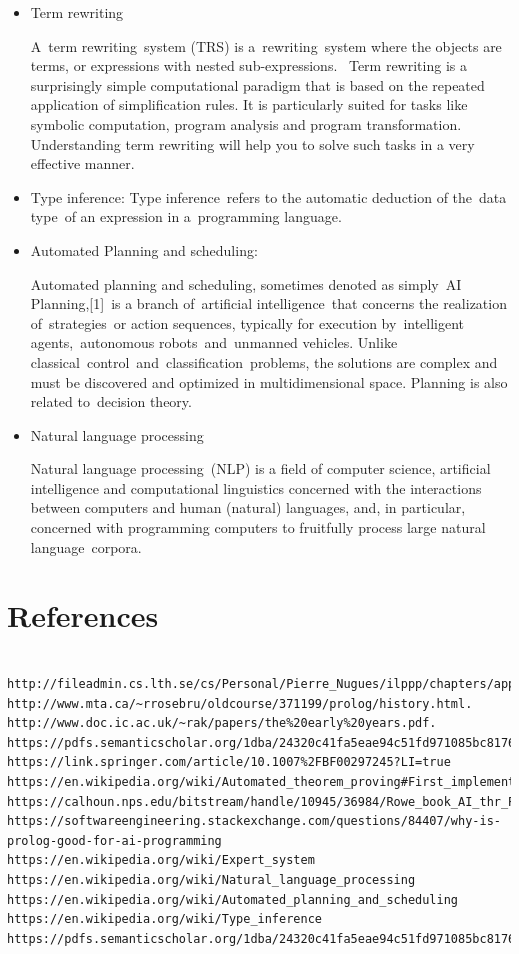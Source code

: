 \documentclass[14pt]{article}
\begin{document}
\begin{itemize}
\item Term rewriting

A term rewriting system (TRS) is a rewriting system where the objects are terms, or expressions with nested sub-expressions. 
Term rewriting is a surprisingly simple computational paradigm that is based on the repeated application of simplification rules. It is particularly suited for tasks like symbolic computation, program analysis and program transformation. Understanding term rewriting will help you to solve such tasks in a very effective manner.

\item Type inference: 
Type inference refers to the automatic deduction of the data type of an expression in a programming language.

\item Automated Planning and scheduling: 

Automated planning and scheduling, sometimes denoted as simply AI Planning,[1] is a branch of artificial intelligence that concerns the realization of strategies or action sequences, typically for execution by intelligent agents, autonomous robots and unmanned vehicles. Unlike classical control and classification problems, the solutions are complex and must be discovered and optimized in multidimensional space. Planning is also related to decision theory.


\item Natural language processing

Natural language processing (NLP) is a field of computer science, artificial intelligence and computational linguistics concerned with the interactions between computers and human (natural) languages, and, in particular, concerned with programming computers to fruitfully process large natural language corpora.
\end{itemize}
\newpage
\section{References} 
\begin{verbatim}
	
http://fileadmin.cs.lth.se/cs/Personal/Pierre_Nugues/ilppp/chapters/appA.pdf.
http://www.mta.ca/~rrosebru/oldcourse/371199/prolog/history.html. 
http://www.doc.ic.ac.uk/~rak/papers/the%20early%20years.pdf.
https://pdfs.semanticscholar.org/1dba/24320c41fa5eae94c51fd971085bc8176dd7.pdf
https://link.springer.com/article/10.1007%2FBF00297245?LI=true
https://en.wikipedia.org/wiki/Automated_theorem_proving#First_implementations
https://calhoun.nps.edu/bitstream/handle/10945/36984/Rowe_book_AI_thr_Prolog_preface.pdf https://softwareengineering.stackexchange.com/questions/84407/why-is-prolog-good-for-ai-programming
https://en.wikipedia.org/wiki/Expert_system
https://en.wikipedia.org/wiki/Natural_language_processing 
https://en.wikipedia.org/wiki/Automated_planning_and_scheduling 
https://en.wikipedia.org/wiki/Type_inference https://pdfs.semanticscholar.org/1dba/24320c41fa5eae94c51fd971085bc8176dd7.pdf 

\end{verbatim}
\end{document}

